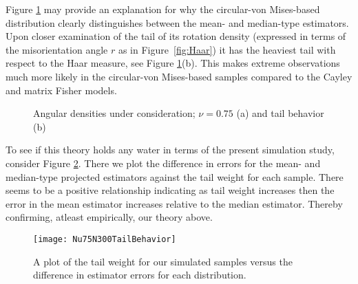 \noindent Figure \ref{fig:dendetail} may provide an explanation for why the circular-von Mises-based distribution clearly distinguishes between the mean- and median-type estimators.  Upon closer examination of the tail of its rotation density (expressed in terms of the misorientation angle $r$ as in Figure~\ref{fig:Haar}) it has the heaviest tail with respect to the Haar measure, see Figure \ref{fig:dendetail}(b). This makes extreme observations much more likely in the circular-von Mises-based samples compared to the Cayley and matrix Fisher models. 
\begin{figure}[h!]
\centering
{}
\caption{Angular densities under consideration; $\nu=0.75$ (a) and tail behavior (b) }
\label{fig:dendetail}
\end{figure}

To see if this theory holds any water in terms of the present simulation study, consider Figure \ref{fig:SimTail}.  There we plot the difference in errors for the mean- and median-type projected estimators against the tail weight for each sample.  There seems to be a positive relationship indicating as tail weight increases then the error in the mean estimator increases relative to the median estimator.  Thereby confirming, atleast empirically, our theory above.

\begin{figure}[h!]
\centering
\texttt{[image: Nu75N300TailBehavior]}
\caption{A plot of the tail weight for our simulated samples versus the difference in estimator errors for each distribution.}
\label{fig:SimTail}
\end{figure}


